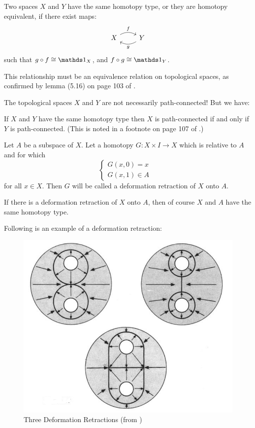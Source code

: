 \begin{defi}
    Two spaces $X$ and $Y$ have the same homotopy type, or they are
    homotopy equivalent, if there exist maps:
    $$ \begin{tikzcd}[]
        X\ar[r,"f",bend left] & Y\ar[l,"g",bend left]
    \end{tikzcd}$$
    such that $g\circ f\cong \id_X$, and $f\circ g\cong\id_Y$.
\end{defi}
\begin{fact}
This relationship must be an equivalence relation on topological
spaces, as confirmed by lemma (5.16) on page 103 of \cite{book}.
\end{fact}
\begin{remark}
    The topological spaces $X$ and $Y$ are not necessarily
    path-connected! But we have:
\end{remark}
\begin{fact}
    If $X$ and $Y$ have the same homotopy type then $X$ is
    path-connected if and only if $Y$ is path-connected. (This is
    noted in a footnote on page 107 of \cite{book}.)
\end{fact}
\begin{defi}
    Let $A$ be a subspace of $X$. Let a homotopy $G:X\times I\to X$ which
    is relative to $A$ and for which
    $$ \begin{cases}
        G(x,0)=x & \\
        G(x,1)\in A
    \end{cases}$$
    for all $x\in X$. Then $G$ will be called a deformation retraction
    of $X$ onto $A$.
\end{defi}
\begin{remark}
    If there is a deformation retraction of $X$ onto $A$, then of
    course $X$ and $A$ have the same homotopy type.
\end{remark}
Following is an example of a deformation retraction:
\begin{figure}[H]
    \centering
    \includegraphics[width=0.8\linewidth]{pics/deformation-retraction.PNG}
    \caption{Three Deformation Retractions (from \cite{book})}
\end{figure}


